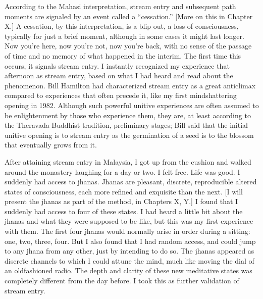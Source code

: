 \documentclass[a5paper,10pt,english]{book}
\begin{document}
\sphinxAtStartPar
According to the Mahasi interpretation, stream entry and subsequent path
moments are signaled by an event called a “cessation.” {[}More on this in
Chapter X.{]} A cessation, by this interpretation, is a blip out, a loss
of consciousness, typically for just a brief moment, although in some
cases it might last longer. Now you’re here, now you’re not, now you’re
back, with no sense of the passage of time and no memory of what
happened in the interim. The first time this occurs, it signals stream
entry. I instantly recognized my experience that afternoon as stream
entry, based on what I had heard and read about the phenomenon. Bill
Hamilton had characterized stream entry as a great anticlimax compared
to experiences that often precede it, like my first mind\sphinxhyphen{}shattering
opening in 1982. Although such powerful unitive experiences are often
assumed to be enlightenment by those who experience them, they are, at
least according to the Theravada Buddhist tradition, preliminary stages;
Bill said that the initial unitive opening is to stream entry as the
germination of a seed is to the blossom that eventually grows from it.

\sphinxAtStartPar
After attaining stream entry in Malaysia, I got up from the cushion and
walked around the monastery laughing for a day or two. I felt free. Life
was good. I suddenly had access to jhanas. Jhanas are pleasant,
discrete, reproducible altered states of consciousness, each more
refined and exquisite than the next. {[}I will present the jhanas as part
of the method, in Chapters X, Y.{]} I found that I suddenly had access to
four of these states. I had heard a little bit about the jhanas and what
they were supposed to be like, but this was my first experience with
them. The first four jhanas would normally arise in order during a
sitting: one, two, three, four. But I also found that I had random
access, and could jump to any jhana from any other, just by intending to
do so. The jhanas appeared as discrete channels to which I could attune
the mind, much like moving the dial of an old\sphinxhyphen{}fashioned radio. The depth
and clarity of these new meditative states was completely different from
the day before. I took this as further validation of stream entry.
\end{document}
